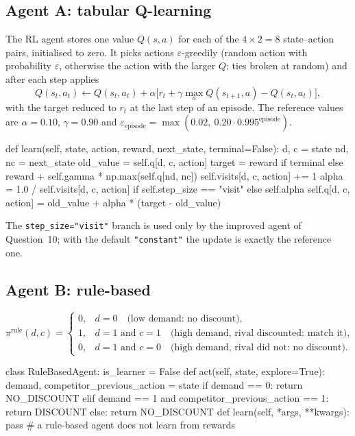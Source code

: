 \documentclass[11pt, a4paper]{article}
\newcommand{\code}[1]{\texttt{#1}}
\begin{document}
\subsection{Agent A: tabular Q-learning}

The RL agent stores one value $Q(s, a)$ for each of the $4 \times 2 = 8$ state--action pairs, initialised to zero. It picks actions $\varepsilon$-greedily (random action with probability $\varepsilon$, otherwise the action with the larger $Q$; ties broken at random) and after each step applies
\[
Q(s_t, a_t) \leftarrow Q(s_t, a_t) + \alpha \Big[ r_t + \gamma \max_{a} Q(s_{t+1}, a) - Q(s_t, a_t) \Big],
\]
with the target reduced to $r_t$ at the last step of an episode. The reference values are $\alpha = 0.10$, $\gamma = 0.90$ and $\varepsilon_{\text{episode}} = \max(0.02,\ 0.20 \cdot 0.995^{\text{episode}})$.

\begin{codeblock}
def learn(self, state, action, reward, next_state, terminal=False):
    d, c = state
    nd, nc = next_state
    old_value = self.q[d, c, action]
    target = reward if terminal else reward + self.gamma * np.max(self.q[nd, nc])
    self.visits[d, c, action] += 1
    alpha = 1.0 / self.visits[d, c, action] if self.step_size == "visit" else self.alpha
    self.q[d, c, action] = old_value + alpha * (target - old_value)
\end{codeblock}

The \code{step\_size="visit"} branch is used only by the improved agent of Question~10; with the default \code{"constant"} the update is exactly the reference one.

\subsection{Agent B: rule-based}

\[
\pi^{\text{rule}}(d, c) =
\begin{cases}
0, & d = 0 \quad\text{(low demand: no discount)},\\
1, & d = 1 \text{ and } c = 1 \quad\text{(high demand, rival discounted: match it)},\\
0, & d = 1 \text{ and } c = 0 \quad\text{(high demand, rival did not: no discount)}.
\end{cases}
\]

\begin{codeblock}
class RuleBasedAgent:
    is_learner = False
    def act(self, state, explore=True):
        demand, competitor_previous_action = state
        if demand == 0:
            return NO_DISCOUNT
        elif demand == 1 and competitor_previous_action == 1:
            return DISCOUNT
        else:
            return NO_DISCOUNT
    def learn(self, *args, **kwargs):
        pass        # a rule-based agent does not learn from rewards
\end{codeblock}
\end{document}
